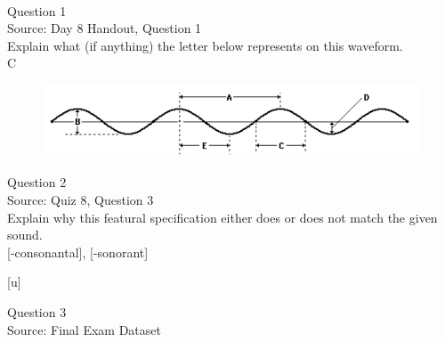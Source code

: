 \documentclass[12pt]{article}
\begin{document}
\newpage

\begin{center}
\textbf{{\color{red}{\HUGE END OF EXAM}}}\\

\end{center}
\newpage

\begin{center}
\textbf{{\color{blue}{\HUGE START OF EXAM\\}}}

\textbf{{\color{blue}{\HUGE Student ID: 8079\\}}}

\textbf{{\color{blue}{\HUGE 12:50 - 1:10 PM\\}}}

\end{center}
\newpage

{\large Question 1}\\

Source: Day 8 Handout, Question 1\\

Explain what (if anything) the letter below represents on this waveform.\\

C

\begin{figure}[H]
\includegraphics{../images/sinusoid.png}
\end{figure}

\newpage

{\large Question 2}\\

Source: Quiz 8, Question 3\\

Explain why this featural specification either does or does not match the given sound.\\

{[-consonantal]}, {[-sonorant]}

{[u]}


\newpage

{\large Question 3}\\

Source: Final Exam Dataset\\
\end{document}
